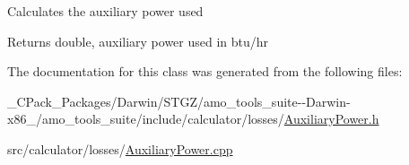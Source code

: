 Calculates the auxiliary power used

\begin{DoxyReturn}{Returns}
double, auxiliary power used in btu/hr 
\end{DoxyReturn}


The documentation for this class was generated from the following files\+:\begin{DoxyCompactItemize}
\item 
\+\_\+\+C\+Pack\+\_\+\+Packages/\+Darwin/\+S\+T\+G\+Z/amo\+\_\+tools\+\_\+suite-\/-\/\+Darwin-\/x86\+\_/amo\+\_\+tools\+\_\+suite/include/calculator/losses/\hyperlink{___c_pack___packages_2_darwin_2_s_t_g_z_2amo__tools__suite--_darwin-x86__64_2amo__tools__suite_2267aa3bc123e671ea39c318431c8657a}{Auxiliary\+Power.\+h}\item 
src/calculator/losses/\hyperlink{_auxiliary_power_8cpp}{Auxiliary\+Power.\+cpp}\end{DoxyCompactItemize}
